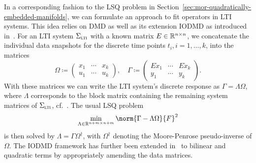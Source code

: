 In a corresponding fashion to the \ac{LSQ} problem in Section~\ref{sec:mor-quadratically-embedded-manifolds}, we can formulate an approach to fit operators in \ac{LTI} systems.
This idea relies on \ac{DMD} as well as its extension \ac{IODMD} as introduced in~\cite{Annoni2016}.
For an \ac{LTI} system $\Sigma_{\textnormal{\scshape lti}}$ with a known matrix $E \in \mathbb{R}^{n \times n}$, we concatenate the individual data snapshots for the discrete time points $t_i, i = 1, \dots, k$, into the matrices
\begin{equation}\label{eq:iodmd-data-matrices}
    \Omega \coloneqq \begin{pmatrix}
        x_1 & \cdots & x_k \\
        u_1 & \cdots & u_k
    \end{pmatrix},\quad \Gamma \coloneqq \begin{pmatrix}
        E \dot{x}_1 & \cdots & E \dot{x}_k \\
        y_1 & \cdots & y_k
    \end{pmatrix}.
\end{equation}
With these matrices we can write the \ac{LTI} system's discrete response as $\Gamma = \Lambda \Omega$, where $\Lambda$ corresponds to the block matrix containing the remaining system matrices of $\Sigma_{\textnormal{\scshape lti}}$, cf.~\cite{Heiland2022}.
The usual \ac{LSQ} problem
\begin{equation*}
    \min\limits_{\Lambda \in \bb{R}^{n + m \times n + m}} \norm{\Gamma - \Lambda \Omega}{F}^2
\end{equation*}
is then solved by $\Lambda = \Gamma \Omega^\dagger$, with $\Omega^\dagger$ denoting the Moore-Penrose pseudo-inverse of $\Omega$.
The \ac{IODMD} framework has further been extended in~\cite{Gosea2021} to bilinear and quadratic terms by appropriately amending the data matrices.

